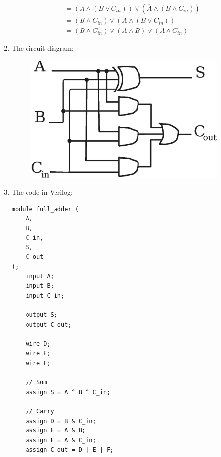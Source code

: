 \documentclass{article}
\begin{document}
\begin{enumerate}[label={\alph*)}]
\begin{displaymath}
\begin{aligned}
                &= (A \land (B \lor C_{in})) \lor (\overline{A} \land (B \land C_{in})) \\
                &= (B \land C_{in}) \lor (A \land (B \lor C_{in})) \\
                &= (B \land C_{in}) \lor (A \land B) \lor (A \land C_{in})
            \end{aligned}
        \end{displaymath}
        \item The circuit diagram: 
        \begin{figure}[h]
            \includegraphics[width=10cm]{full-adder-diagram.eps}
        \end{figure}
        \newpage
        \item The code in Verilog:
        \begin{lstlisting}
module full_adder (
    A,
    B,
    C_in,
    S,
    C_out
);
    input A;
    input B;
    input C_in;

    output S;
    output C_out;

    wire D;
    wire E;
    wire F;

    // Sum
    assign S = A ^ B ^ C_in;
    
    // Carry
    assign D = B & C_in;
    assign E = A & B;
    assign F = A & C_in;
    assign C_out = D | E | F;


\end{lstlisting}
\end{enumerate}
\end{document}
